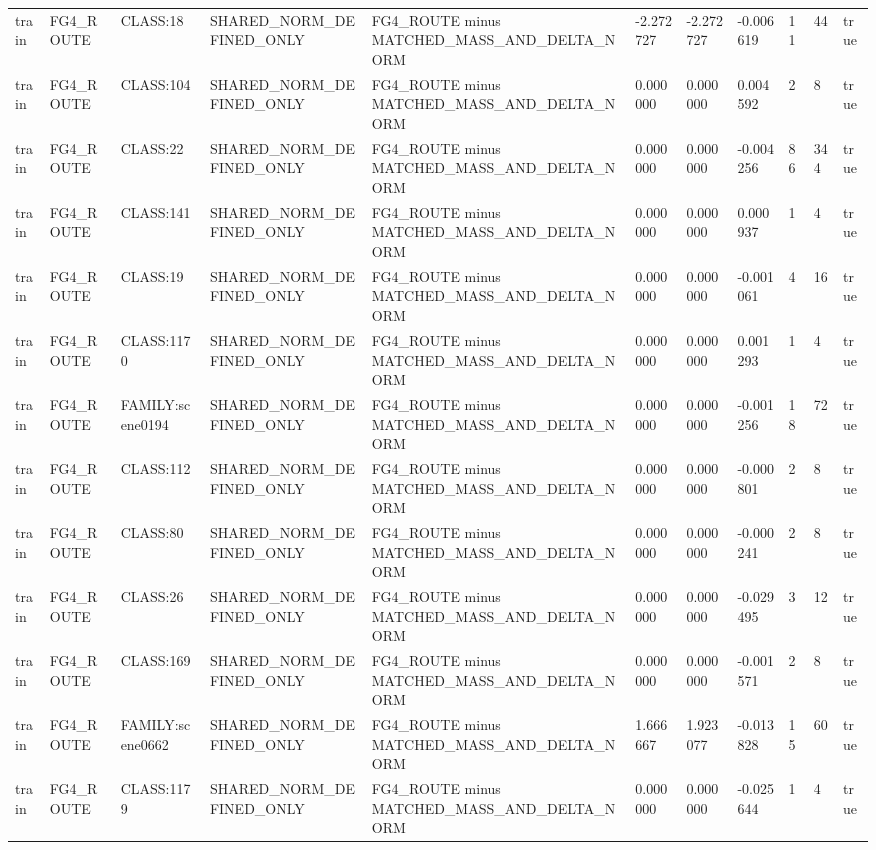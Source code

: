 \begin{tabular}{lllllllllll}
train & FG4\_ROUTE & CLASS:18 & SHARED\_NORM\_DEFINED\_ONLY & FG4\_ROUTE minus MATCHED\_MASS\_AND\_DELTA\_NORM & -2.272727 & -2.272727 & -0.006619 & 11 & 44 & true \\
train & FG4\_ROUTE & CLASS:104 & SHARED\_NORM\_DEFINED\_ONLY & FG4\_ROUTE minus MATCHED\_MASS\_AND\_DELTA\_NORM & 0.000000 & 0.000000 & 0.004592 & 2 & 8 & true \\
train & FG4\_ROUTE & CLASS:22 & SHARED\_NORM\_DEFINED\_ONLY & FG4\_ROUTE minus MATCHED\_MASS\_AND\_DELTA\_NORM & 0.000000 & 0.000000 & -0.004256 & 86 & 344 & true \\
train & FG4\_ROUTE & CLASS:141 & SHARED\_NORM\_DEFINED\_ONLY & FG4\_ROUTE minus MATCHED\_MASS\_AND\_DELTA\_NORM & 0.000000 & 0.000000 & 0.000937 & 1 & 4 & true \\
train & FG4\_ROUTE & CLASS:19 & SHARED\_NORM\_DEFINED\_ONLY & FG4\_ROUTE minus MATCHED\_MASS\_AND\_DELTA\_NORM & 0.000000 & 0.000000 & -0.001061 & 4 & 16 & true \\
train & FG4\_ROUTE & CLASS:1170 & SHARED\_NORM\_DEFINED\_ONLY & FG4\_ROUTE minus MATCHED\_MASS\_AND\_DELTA\_NORM & 0.000000 & 0.000000 & 0.001293 & 1 & 4 & true \\
train & FG4\_ROUTE & FAMILY:scene0194 & SHARED\_NORM\_DEFINED\_ONLY & FG4\_ROUTE minus MATCHED\_MASS\_AND\_DELTA\_NORM & 0.000000 & 0.000000 & -0.001256 & 18 & 72 & true \\
train & FG4\_ROUTE & CLASS:112 & SHARED\_NORM\_DEFINED\_ONLY & FG4\_ROUTE minus MATCHED\_MASS\_AND\_DELTA\_NORM & 0.000000 & 0.000000 & -0.000801 & 2 & 8 & true \\
train & FG4\_ROUTE & CLASS:80 & SHARED\_NORM\_DEFINED\_ONLY & FG4\_ROUTE minus MATCHED\_MASS\_AND\_DELTA\_NORM & 0.000000 & 0.000000 & -0.000241 & 2 & 8 & true \\
train & FG4\_ROUTE & CLASS:26 & SHARED\_NORM\_DEFINED\_ONLY & FG4\_ROUTE minus MATCHED\_MASS\_AND\_DELTA\_NORM & 0.000000 & 0.000000 & -0.029495 & 3 & 12 & true \\
train & FG4\_ROUTE & CLASS:169 & SHARED\_NORM\_DEFINED\_ONLY & FG4\_ROUTE minus MATCHED\_MASS\_AND\_DELTA\_NORM & 0.000000 & 0.000000 & -0.001571 & 2 & 8 & true \\
train & FG4\_ROUTE & FAMILY:scene0662 & SHARED\_NORM\_DEFINED\_ONLY & FG4\_ROUTE minus MATCHED\_MASS\_AND\_DELTA\_NORM & 1.666667 & 1.923077 & -0.013828 & 15 & 60 & true \\
train & FG4\_ROUTE & CLASS:1179 & SHARED\_NORM\_DEFINED\_ONLY & FG4\_ROUTE minus MATCHED\_MASS\_AND\_DELTA\_NORM & 0.000000 & 0.000000 & -0.025644 & 1 & 4 & true \\

\end{tabular}
